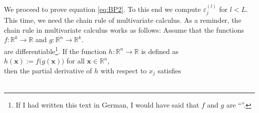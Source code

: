 We proceed to prove equation \ref{eq:BP2}.  To this end we compute $\varepsilon_j^{(l)}$ for $l < L$.  
This time, we need the chain rule of multivariate calculus.  As a reminder, the chain rule in multivariate calculus
works as follows:  Assume that the functions
\\[0.2cm]
\hspace*{1.3cm}
$f: \mathbb{R}^k \rightarrow \mathbb{R}$ \quad and \quad
$g: \mathbb{R}^n \rightarrow \mathbb{R}^k$. 
\\[0.2cm]
are differentiable\footnote{
  If I had written this text in German, I would have said that $f$ and $g$ are ``''.
}.  
If the function $h: \mathbb{R}^n \rightarrow \mathbb{R}$ is defined as
\\[0.2cm]
\hspace*{1.3cm}
$h(\mathbf{x}) := f\bigl(g(\mathbf{x})\bigr)$ \quad for all $\mathbf{x} \in \mathbb{R}^n$,
\\[0.2cm]
then the partial derivative of $h$ with respect to $x_j$ satisfies
\\[0.2cm]
\hspace*{0.3cm}
\colorbox{red}{}
\\[0.2cm]

